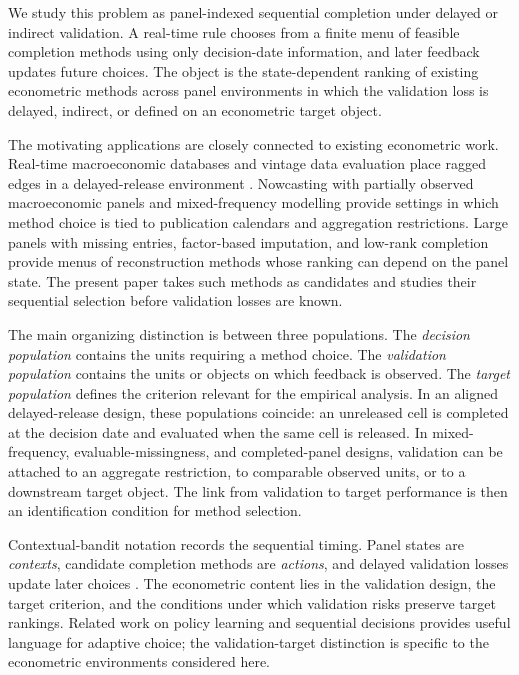 \documentclass[a4paper, 12pt]{article}
\theoremstyle{plain}
\theoremstyle{remark}
\newcommand{\1}{\mathbf{1}}
\begin{document}
We study this problem as panel-indexed sequential completion under delayed or indirect validation. A real-time rule chooses from a finite menu of feasible completion methods using only decision-date information, and later feedback updates future choices. The object is the state-dependent ranking of existing econometric methods across panel environments in which the validation loss is delayed, indirect, or defined on an econometric target object.

The motivating applications are closely connected to existing econometric work. Real-time macroeconomic databases and vintage data evaluation place ragged edges in a delayed-release environment \citep{CroushoreStark2001,McCrackenNg2016}. Nowcasting with partially observed macroeconomic panels \citep{GiannoneReichlinSmall2008,BanburaModugno2014,AkbalGiannone2026} and mixed-frequency modelling \citep{MarianoMurasawa2003,BaiGhyselsWright2013,AnkargrenJoneus2021} provide settings in which method choice is tied to publication calendars and aggregation restrictions. Large panels with missing entries, factor-based imputation, and low-rank completion \citep{BaiNg2021,JinMiaoSu2021,CahanBaiNg2023,XiongPelger2023,DuanPelgerXiong2024,SuWang2025} provide menus of reconstruction methods whose ranking can depend on the panel state. The present paper takes such methods as candidates and studies their sequential selection before validation losses are known.

The main organizing distinction is between three populations. The \emph{decision population} contains the units requiring a method choice. The \emph{validation population} contains the units or objects on which feedback is observed. The \emph{target population} defines the criterion relevant for the empirical analysis. In an aligned delayed-release design, these populations coincide: an unreleased cell is completed at the decision date and evaluated when the same cell is released. In mixed-frequency, evaluable-missingness, and completed-panel designs, validation can be attached to an aggregate restriction, to comparable observed units, or to a downstream target object. The link from validation to target performance is then an identification condition for method selection.

Contextual-bandit notation records the sequential timing. Panel states are \emph{contexts}, candidate completion methods are \emph{actions}, and delayed validation losses update later choices \citep{LaiRobbins1985,LattimoreSzepesvari2020}. The econometric content lies in the validation design, the target criterion, and the conditions under which validation risks preserve target rankings. Related work on policy learning and sequential decisions \citep{AtheyWager2021,Kock2022JASA} provides useful language for adaptive choice; the validation-target distinction is specific to the econometric environments considered here.
\end{document}
